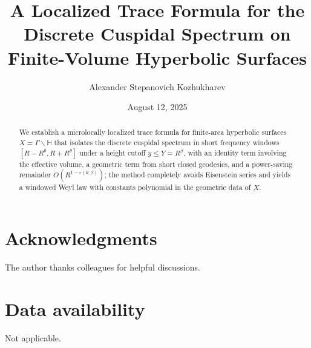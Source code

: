 \documentclass[12pt]{amsart}
\title[A Localized Trace Formula]{A Localized Trace Formula for the Discrete Cuspidal Spectrum on Finite-Volume Hyperbolic Surfaces}
\author{Alexander Stepanovich Kozhukharev}
\date{August 12, 2025}
\numberwithin{equation}{section}
\theoremstyle{plain}
\theoremstyle{definition}
\theoremstyle{remark}
\newcommand{\HH}{\mathbb{H}}
\newcommand{\EpsDef}{\min\{\theta,\,1-\theta+\beta,\,\tfrac{1}{2},\,1-2\theta+\beta\}-\delta}
\begin{document}
\begin{abstract}
We establish a microlocally localized trace formula for finite-area hyperbolic surfaces $X=\Gamma\backslash\HH$ that isolates the discrete cuspidal spectrum in short frequency windows $[R-R^\theta,R+R^\theta]$ under a height cutoff $y\le Y=R^\beta$, with an identity term involving the effective volume, a geometric term from short closed geodesics, and a power-saving remainder $O(R^{1-\varepsilon(\theta,\beta)})$; the method completely avoids Eisenstein series and yields a windowed Weyl law with constants polynomial in the geometric data of $X$.
\end{abstract}


\maketitle

\tableofcontents




\section*{Acknowledgments}
The author thanks colleagues for helpful discussions.

\section*{Data availability}
Not applicable.

\clearpage
\appendix

\end{document}
